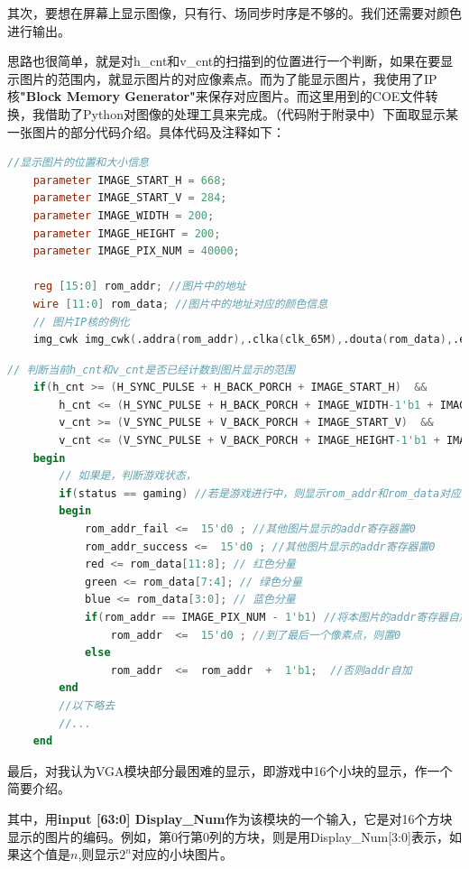 \documentclass[UTF8]{article}
\newcommand{\jumpline} {\hspace*{\fill} \par}
\begin{document}
	其次，要想在屏幕上显示图像，只有行、场同步时序是不够的。我们还需要对颜色进行输出。\par
	思路也很简单，就是对h\_cnt和v\_cnt的扫描到的位置进行一个判断，如果在要显示图片的范围内，就显示图片的对应像素点。而为了能显示图片，我使用了IP核\textbf{"Block Memory Generator"}来保存对应图片。而这里用到的COE文件转换，我借助了Python对图像的处理工具来完成。（代码附于附录中）下面取显示某一张图片的部分代码介绍。具体代码及注释如下：\par
	\begin{lstlisting}[language=Verilog, name=一些变量的声明]
	//显示图片的位置和大小信息
	parameter IMAGE_START_H = 668;
	parameter IMAGE_START_V = 284;
	parameter IMAGE_WIDTH = 200;
	parameter IMAGE_HEIGHT = 200;
	parameter IMAGE_PIX_NUM = 40000;
	
	reg [15:0] rom_addr; //图片中的地址
	wire [11:0] rom_data; //图片中的地址对应的颜色信息
	// 图片IP核的例化
	img_cwk img_cwk(.addra(rom_addr),.clka(clk_65M),.douta(rom_data),.ena(1'b1)); 
	\end{lstlisting}\par
	\jumpline
	\begin{lstlisting}[language=Verilog, name=图片显示的部分]
	// 判断当前h_cnt和v_cnt是否已经计数到图片显示的范围
	if(h_cnt >= (H_SYNC_PULSE + H_BACK_PORCH + IMAGE_START_H)  &&
		h_cnt <= (H_SYNC_PULSE + H_BACK_PORCH + IMAGE_WIDTH-1'b1 + IMAGE_START_H)  && 
		v_cnt >= (V_SYNC_PULSE + V_BACK_PORCH + IMAGE_START_V)  &&
		v_cnt <= (V_SYNC_PULSE + V_BACK_PORCH + IMAGE_HEIGHT-1'b1 + IMAGE_START_V))
	begin
		// 如果是，判断游戏状态，
		if(status == gaming) //若是游戏进行中，则显示rom_addr和rom_data对应的图片
		begin
			rom_addr_fail <=  15'd0 ; //其他图片显示的addr寄存器置0
			rom_addr_success <=  15'd0 ; //其他图片显示的addr寄存器置0
			red <= rom_data[11:8]; // 红色分量
			green <= rom_data[7:4]; // 绿色分量
			blue <= rom_data[3:0]; // 蓝色分量
			if(rom_addr == IMAGE_PIX_NUM - 1'b1) //将本图片的addr寄存器自加，直到最后一个像素点
				rom_addr  <=  15'd0 ; //到了最后一个像素点，则置0
			else
				rom_addr  <=  rom_addr  +  1'b1;  //否则addr自加
		end
		//以下略去
		//...
	end
	\end{lstlisting}\par
	\jumpline
	最后，对我认为VGA模块部分最困难的显示，即游戏中16个小块的显示，作一个简要介绍。\par
	其中，用\textbf{input [63:0] Display\_Num}作为该模块的一个输入，它是对16个方块显示的图片的编码。例如，第0行第0列的方块，则是用Display\_Num[3:0]表示，如果这个值是$n$,则显示$2^{n}$对应的小块图片。\par
\end{document}
